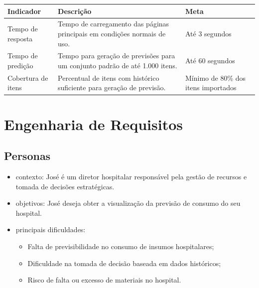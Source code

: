 \documentclass[12pt,a4paper]{article}
\begin{document}
\begin{center}
    \begin{tabular}{p{} p{} p{}}
        \toprule
        \textbf{Indicador}                  & \textbf{Descrição}                           & \textbf{Meta} \\
        \midrule
        Tempo de resposta                   & Tempo de carregamento das páginas principais
        em condições normais de uso.        & Até 3 segundos                                               \\
        \midrule
        Tempo de predição                   & Tempo para geração de previsões para um
        conjunto padrão de até 1.000 itens. & Até 60 segundos                                              \\
        \midrule
        Cobertura de itens                  & Percentual de itens com histórico suficiente
        para geração de previsão.           & Mínimo de 80\% dos itens importados                          \\
        \bottomrule
    \end{tabular}
\end{center}

\section{Engenharia de Requisitos}

\subsection{Personas}

\begin{itemize}
    \item contexto: José é um diretor hospitalar responsável pela gestão de recursos e tomada de decisões estratégicas.
    \item objetivos: José deseja obter a visualização da previsão de consumo do seu hospital.
    \item principais dificuldades:
          \begin{itemize}
              \item Falta de previsibilidade no consumo de insumos hospitalares;
              \item Dificuldade na tomada de decisão baseada em dados históricos;
              \item Risco de falta ou excesso de materiais no hospital.
          \end{itemize}
\end{itemize}
\end{document}
